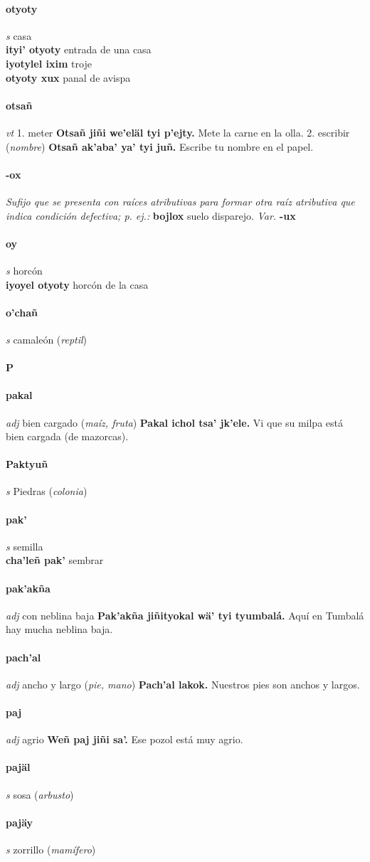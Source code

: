 \documentclass{scrbook}
\newcommand{\entry}[1]{\paragraph{#1}}
\newcommand{\alphaletter}[1]{\addsec{#1}}
\newcommand{\onedefinition}[1]{#1.}
\newcommand{\nontranslationdef}[1]{\textit{#1}}
\newcommand{\partofspeech}[1]{\textit{#1}}
\newcommand{\spanishtranslation}[1]{#1}
\newcommand{\clarification}[1]{(\textit{#1})}
\newcommand{\cholexample}[1]{\textbf{#1}}
\newcommand{\exampletranslation}[1]{#1}
\newcommand{\secondaryentry}[1]{\\\textbf{#1}}
\newcommand{\secondtranslation}[1]{#1}
\newcommand{\variation}[1]{\textit{Var.} \textbf{#1}}
\begin{document}
\begin{multicols}{2}
\entry{otyoty}
\partofspeech{s}
\spanishtranslation{casa}
\secondaryentry{ityi' otyoty}
\secondtranslation{entrada de una casa}
\secondaryentry{iyotylel ixim}
\secondtranslation{troje}
\secondaryentry{otyoty xux}
\secondtranslation{panal de avispa}

\entry{otsañ}
\partofspeech{vt}
\onedefinition{1}
\spanishtranslation{meter}
\cholexample{Otsañ jiñi we'eläl tyi p'ejty.}
\exampletranslation{Mete la carne en la olla.}
\onedefinition{2}
\spanishtranslation{escribir}
\clarification{nombre}
\cholexample{Otsañ ak'aba' ya' tyi juñ.}
\exampletranslation{Escribe tu nombre en el papel.}

\entry{-ox}
\nontranslationdef{Sufijo que se presenta con raíces atributivas para formar otra raíz atributiva que indica condición defectiva; p. ej.:}
\cholexample{bojlox}
\exampletranslation{suelo disparejo.}
\variation{-ux}

\entry{oy}
\partofspeech{s}
\spanishtranslation{horcón}
\secondaryentry{iyoyel otyoty}
\secondtranslation{horcón de la casa}

\entry{o'chañ}
\partofspeech{s}
\spanishtranslation{camaleón}
\clarification{reptil}

\entry{P}
\alphaletter{P}

\entry{pakal}
\partofspeech{adj}
\spanishtranslation{bien cargado}
\clarification{maíz, fruta}
\cholexample{Pakal ichol tsa' jk'ele.}
\exampletranslation{Vi que su milpa está bien cargada (de mazorcas).}

\entry{Paktyuñ}
\partofspeech{s}
\spanishtranslation{Piedras}
\clarification{colonia}

\entry{pak'}
\partofspeech{s}
\spanishtranslation{semilla}
\secondaryentry{cha'leñ pak'}
\secondtranslation{sembrar}

\entry{pak'akña}
\partofspeech{adj}
\spanishtranslation{con neblina baja}
\cholexample{Pak'akña jiñityokal wä' tyi tyumbalá.}
\exampletranslation{Aquí en Tumbalá hay mucha neblina baja.}

\entry{pach'al}
\partofspeech{adj}
\spanishtranslation{ancho y largo}
\clarification{pie, mano}
\cholexample{Pach'al lakok.}
\exampletranslation{Nuestros pies son anchos y largos.}

\entry{paj}
\partofspeech{adj}
\spanishtranslation{agrio}
\cholexample{Weñ paj jiñi sa'.}
\exampletranslation{Ese pozol está muy agrio.}

\entry{pajäl}
\partofspeech{s}
\spanishtranslation{sosa}
\clarification{arbusto}

\entry{pajäy}
\partofspeech{s}
\spanishtranslation{zorrillo}
\clarification{mamífero}


\end{multicols}
\end{document}
